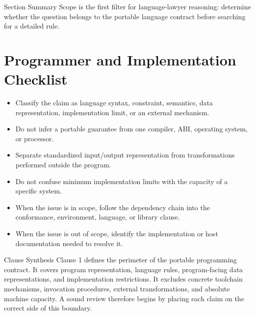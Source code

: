 \documentclass[10pt,letterpaper]{article}
\begin{document}
\begin{CornellSummaryBox}{Section Summary}
Scope is the first filter for language-lawyer reasoning: determine whether the question belongs to the portable language contract before searching for a detailed rule.
\end{CornellSummaryBox}



\section{Programmer and Implementation Checklist}
\begin{itemize}
  \item[$\square$] Classify the claim as language syntax, constraint, semantics, data representation, implementation limit, or an external mechanism.
  \item[$\square$] Do not infer a portable guarantee from one compiler, ABI, operating system, or processor.
  \item[$\square$] Separate standardized input/output representation from transformations performed outside the program.
  \item[$\square$] Do not confuse minimum implementation limits with the capacity of a specific system.
  \item[$\square$] When the issue is in scope, follow the dependency chain into the conformance, environment, language, or library clause.
  \item[$\square$] When the issue is out of scope, identify the implementation or host documentation needed to resolve it.
\end{itemize}

\begin{CornellSummaryBox}{Clause Synthesis}
Clause 1 defines the perimeter of the portable programming contract. It covers program representation, language rules, program-facing data representations, and implementation restrictions. It excludes concrete toolchain mechanisms, invocation procedures, external transformations, and absolute machine capacity. A sound review therefore begins by placing each claim on the correct side of this boundary.
\end{CornellSummaryBox}



\clearpage
\end{document}
